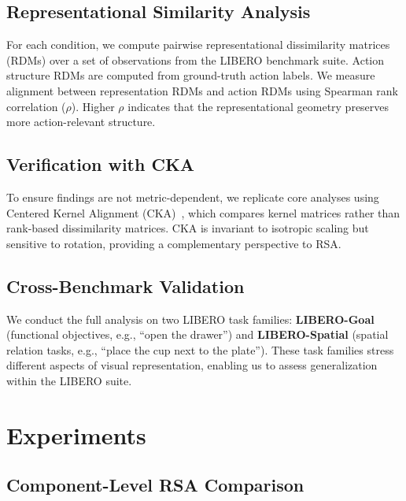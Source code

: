 \documentclass[letterpaper]{article}
\begin{document}
\subsection{Representational Similarity Analysis}

For each condition, we compute pairwise representational dissimilarity matrices (RDMs) over a set of observations from the LIBERO benchmark suite.
Action structure RDMs are computed from ground-truth action labels.
We measure alignment between representation RDMs and action RDMs using Spearman rank correlation ($\rho$).
Higher $\rho$ indicates that the representational geometry preserves more action-relevant structure.

\subsection{Verification with CKA}

To ensure findings are not metric-dependent, we replicate core analyses using Centered Kernel Alignment (CKA)~\citep{kornblith2019cka}, which compares kernel matrices rather than rank-based dissimilarity matrices.
CKA is invariant to isotropic scaling but sensitive to rotation, providing a complementary perspective to RSA.

\subsection{Cross-Benchmark Validation}

We conduct the full analysis on two LIBERO task families:
\textbf{LIBERO-Goal} (functional objectives, e.g., ``open the drawer'') and \textbf{LIBERO-Spatial} (spatial relation tasks, e.g., ``place the cup next to the plate'').
These task families stress different aspects of visual representation, enabling us to assess generalization within the LIBERO suite.

\section{Experiments}
\label{sec:experiments}

\subsection{Component-Level RSA Comparison}
\label{sec:exp_component}
\end{document}
